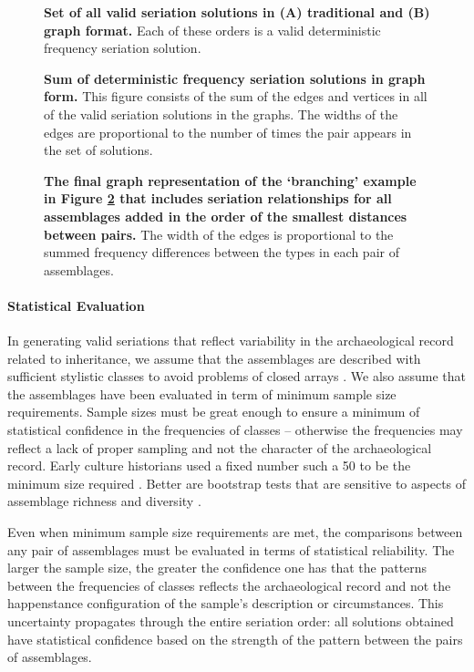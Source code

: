 \documentclass[10pt,letterpaper]{article}
\begin{document}
\begin{figure}[h]
\caption{{\bf Set of all valid seriation solutions in (A) traditional and (B) graph format.} Each of these orders is a valid deterministic frequency seriation solution.}
\label{fig7}
\end{figure}

\begin{figure}[h]
\caption{{\bf Sum of deterministic frequency seriation solutions in graph form.} This figure consists of the sum of the edges and vertices in all of the valid seriation solutions in the graphs. The widths of the edges are proportional to the number of times the pair appears in the set of solutions.}
\label{fig8}
\end{figure}

\begin{figure}[h]
\caption{{\bf The final graph representation of the ‘branching’ example in Figure 
\ref{fig8} that includes seriation relationships for all assemblages added in the order of the smallest distances between pairs.} The width of the edges is proportional to the summed frequency differences between the types in each pair of assemblages. }
\label{fig9}
\end{figure}


\paragraph{Statistical Evaluation}

In generating valid seriations that reflect variability in the archaeological record related to inheritance, we assume that the assemblages are described with sufficient stylistic classes \cite{Dunnell1978,Lipo2001} to avoid problems of closed arrays \cite{McNutt1973}.  We also assume that the assemblages have been evaluated in term of minimum sample size requirements. Sample sizes must be great enough to ensure a minimum of statistical confidence in the frequencies of classes – otherwise the frequencies may reflect a lack of proper sampling and not the character of the archaeological record. Early culture historians used a fixed number such a 50 to be the minimum size required \cite{Phillips1951}. Better are bootstrap tests that are sensitive to aspects of assemblage richness and diversity \cite{Cochrane2003,Lipo1997Population}. 

Even when minimum sample size requirements are met, the comparisons between any pair of assemblages must be evaluated in terms of statistical reliability. The larger the sample size, the greater the confidence one has that the patterns between the frequencies of classes reflects the archaeological record and not the happenstance configuration of the sample’s description or circumstances. This uncertainty propagates through the entire seriation order: all solutions obtained have statistical confidence based on the strength of the pattern between the pairs of assemblages. 
\end{document}
